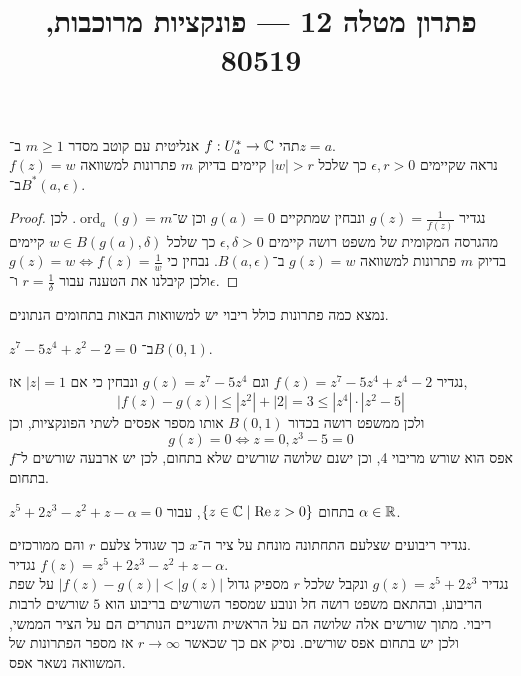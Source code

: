 
\title{פתרון מטלה 12 --- פונקציות מרוכבות, 80519}


\maketitle
\maketitleprint{}

\question{}
תהי $f : U_a^* \to \mathbb{C}$ אנליטית עם קוטב מסדר $m \ge 1$ ב־$z = a$. \\
נראה שקיימים $\epsilon, r > 0$ כך שלכל $|w| > r$ קיימים בדיוק $m$ פתרונות למשוואה $f(z) = w$ ב־$B^*(a, \epsilon)$.
\begin{proof}
	נגדיר $g(z) = \frac{1}{f(z)}$ ונבחין שמתקיים $g(a) = 0$ וכן ש־$\operatorname{ord}_a(g) = m$.
	לכן מהגרסה המקומית של משפט רושה קיימים $\epsilon, \delta > 0$ כך שלכל $w \in B(g(a), \delta)$ קיימים בדיוק $m$ פתרונות למשוואה $g(z) = w$ ב־$B(a, \epsilon)$.
	נבחין כי $g(z) = w \iff f(z) = \frac{1}{w}$ ולכן קיבלנו את הטענה עבור $r = \frac{1}{\delta}$ ו־$\epsilon$.
\end{proof}

\question{}
נמצא כמה פתרונות כולל ריבוי יש למשוואות הבאות בתחומים הנתונים.

\subquestion{}
$z^7 - 5z^4 + z^2 - 2 = 0$ ב־$B(0, 1)$.
\begin{solution}
	נגדיר $f(z) = z^7 - 5z^4 + z^4 - 2$ וגם $g(z) = z^7 - 5z^4$ ונבחין כי אם $|z| = 1$ אז,
	\[
		|f(z) - g(z)|
		\le |z^2| + |2|
		= 3
		\le |z^4| \cdot |z^2 - 5|
	\]
	ולכן ממשפט רושה בכדור $B(0, 1)$ אותו מספר אפסים לשתי הפונקציות, וכן
	\[
		g(z) = 0
		\iff z = 0, z^3 - 5 = 0
	\]
	אפס הוא שורש מריבוי 4, וכן ישנם שלושה שורשים שלא בתחום, לכן יש ארבעה שורשים ל־$f$ בתחום.
\end{solution}

\subquestion{}
$z^5 + 2z^3 - z^2 + z - \alpha = 0$ בתחום $\{ z \in \mathbb{C} \mid \operatorname{Re} z > 0 \}$, עבור $\alpha \in \mathbb{R}$.
\begin{solution}
	נגדיר ריבועים שצלעם התחתונה מונחת על ציר ה־$x$ כך שגודל צלעם $r$ והם ממורכזים. \\
	נגדיר $f(z) = z^5 + 2z^3 - z^2 + z - \alpha$. \\
	נגדיר $g(z) = z^5 + 2z^3$ ונקבל שלכל $r$ מספיק גדול $|f(z) - g(z)| < |g(z)|$ על שפת הריבוע, ובהתאם משפט רושה חל ונובע שמספר השורשים בריבוע הוא $5$ שורשים לרבות ריבוי.
	מתוך שורשים אלה שלושה הם על הראשית והשניים הנותרים הם על הציר הממשי, ולכן יש בתחום אפס שורשים.
	נסיק אם כך שכאשר $r \to \infty$ אז מספר הפתרונות של המשוואה נשאר אפס.
\end{solution}

